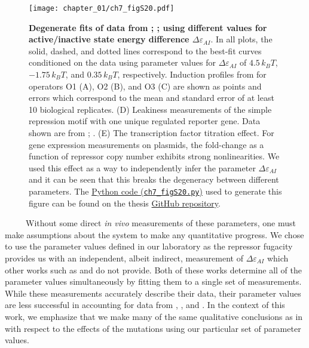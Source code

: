 \documentclass[12pt]{caltech_thesis}
\begin{document}
\hypertarget{fig:lit_degeneracy}{%
\begin{figure}
\centering
\texttt{[image: chapter\_01/ch7\_figS20.pdf]}
\caption[{Degenerate fits of data using parameter values from the
literature.}]{\textbf{Degenerate fits of data from
\textcite{razo-mejia2018}; \textcite{brewster2014};
\textcite{garcia2011} using different values for active/inactive state
energy difference \(\Delta\varepsilon_{AI}\)}. In all plots, the solid,
dashed, and dotted lines correspond to the best-fit curves conditioned
on the data using parameter values for \(\Delta\varepsilon_{AI}\) of
\(4.5\, k_BT\), \(-1.75\, k_BT\), and \(0.35\, k_BT\), respectively.
Induction profiles from \textcite{razo-mejia2018} for operators O1 (A),
O2 (B), and O3 (C) are shown as points and errors which correspond to
the mean and standard error of at least 10 biological replicates. (D)
Leakiness measurements of the simple repression motif with one unique
regulated reporter gene. Data shown are from \textcite{garcia2011};
\textcite{brewster2014}. (E) The transcription factor titration effect.
For gene expression measurements on plasmids, the fold-change as a
function of repressor copy number exhibits strong nonlinearities. We
used this effect as a way to independently infer the parameter
\(\Delta\varepsilon_{AI}\) and it can be seen that this breaks the
degeneracy between different parameters. The
\href{https://github.com/gchure/phd/blob/master/src/chapter_07/code/ch7_figS20.py}{Python
code (\texttt{ch7\_figS20.py})} used to generate this figure can be
found on the thesis \href{https://github.com/gchure/phd}{GitHub
repository}.}
\label{fig:lit_degeneracy}
\end{figure}
}

~~~~~Without some direct \emph{in vivo} measurements of these
parameters, one must make assumptions about the system to make any
quantitative progress. We chose to use the parameter values defined in
our laboratory as the repressor fugacity provides us with an
independent, albeit indirect, measurement of \(\Delta\varepsilon_{AI}\)
which other works such as \textcite{daber2011} and
\textcite{ogorman1980} do not provide. Both of these works determine all
of the parameter values simultaneously by fitting them to a single set
of measurements. While these measurements accurately describe their
data, their parameter values are less successful in accounting for data
from \textcite{brewster2014}, \textcite{garcia2011}, and
\textcite{razo-mejia2018}. In the context of this work, we emphasize
that we make many of the same qualitative conclusions as in
\textcite{daber2011} with respect to the effects of the mutations using
our particular set of parameter values.
\end{document}
